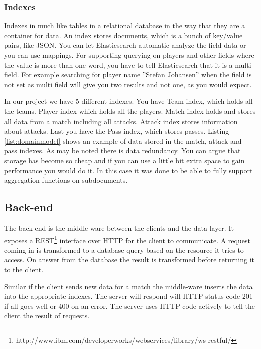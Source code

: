 
\subsubsection{Indexes}

Indexes in much like tables in a relational database in the way that they are a container for data. An index stores documents, which is a bunch of key/value pairs, like \ac{JSON}. You can let Elasticsearch automatic analyze the field data or you can use mappings. For supporting querying on players and other fields where the value is more than one word, you have to tell Elasticsearch that it is a multi field. For example searching for player name ''Stefan Johansen'' when the field is not set as multi field will give you two results and not one, as you would expect.

In our project we have 5 different indexes. You have Team index, which holds all the teams. Player index which holds all the players. Match index holds and stores all data from a match including all attacks. Attack index stores information about attacks. Last you have the Pass index, which stores passes. Listing \ref{list:domainmodel} shows an example of data stored in the match, attack and pass indexes. 
As may be noted there is data redundancy. You can argue that storage has become so cheap and if you can use a little bit extra space to gain performance you would do it. In this case it was done to be able to fully support aggregation functions on subdocuments.

\subsection{Back-end}

The back end is the middle-ware between the clients and the data layer. It exposes a \ac{REST}\footnote{http://www.ibm.com/developerworks/webservices/library/ws-restful/} interface over \ac{HTTP} for the client to communicate. A request coming in is transformed to a database query based on the resource it tries to access. On answer from the database the result is transformed before returning it to the client. 

Similar if the client sends new data for a match the middle-ware inserts the data into the appropriate indexes. The server will respond will HTTP status code 201 if all goes well or 400 on an error. The server uses \ac{HTTP} code actively to tell the client the result of requests.

